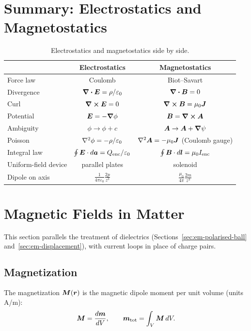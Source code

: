 \section{Summary: Electrostatics and Magnetostatics}

\begin{table}[ht]
\centering
\renewcommand{\arraystretch}{1.6}
\begin{tabular}{l|c|c}
    & Electrostatics & Magnetostatics\\\hline
    Force law & Coulomb & Biot--Savart\\
    Divergence & $\div\vect{E} = \rho/\varepsilon_0$ & $\div\vect{B} = 0$\\
    Curl & $\curl\vect{E} = 0$ & $\curl\vect{B} = \mu_0\vect{J}$\\
    Potential & $\vect{E} = -\grad\phi$ & $\vect{B} = \curl\vect{A}$\\
    Ambiguity & $\phi\to\phi+c$ & $\vect{A}\to\vect{A}+\grad\psi$\\
    Poisson & $\laplacian\phi = -\rho/\varepsilon_0$ & $\laplacian\vect{A} = -\mu_0\vect{J}$ (Coulomb gauge)\\
    Integral law & $\oint\vect{E}\cdot d\lvect{a} = Q_{\text{enc}}/\varepsilon_0$ & $\oint\vect{B}\cdot d\lvect{l} = \mu_0I_{\text{enc}}$\\
    Uniform-field device & parallel plates & solenoid\\
    Dipole on axis & $\frac{1}{4\pi\varepsilon_0}\frac{2p}{z^3}$ & $\frac{\mu_0}{4\pi}\frac{2m}{z^3}$
\end{tabular}
\caption{Electrostatics and magnetostatics side by side.}
\end{table}


\section{Magnetic Fields in Matter}
\label{sec:em-magnetization}

This section parallels the treatment of dielectrics (Sections~\ref{sec:em-polarised-ball} and~\ref{sec:em-displacement}), with current loops in place of charge pairs.

\subsection{Magnetization}

\begin{definition}[Magnetization]
The magnetization $\vect{M}(\lvect{r})$ is the magnetic dipole moment per unit volume (units A/m):
\[
    \vect{M} = \frac{d\lvect{m}}{dV},
    \qquad
    \lvect{m}_{\text{tot}} = \int_V\vect{M}\,dV .
\]
\end{definition}

